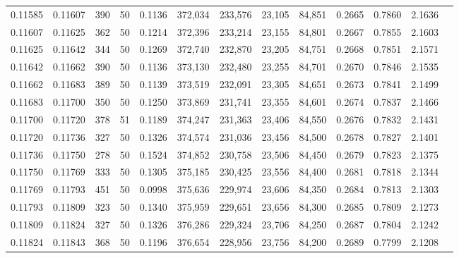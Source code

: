 \begin{tabular}{rrrrrrrrrrrrr}
0.11585 & 0.11607 &   390 &  50 &                                     0.1136 & 372,034 & 233,576 &  23,105 &  84,851 & 0.2665 & 0.7860 & 2.1636 \\
0.11607 & 0.11625 &   362 &  50 &                                     0.1214 & 372,396 & 233,214 &  23,155 &  84,801 & 0.2667 & 0.7855 & 2.1603 \\
0.11625 & 0.11642 &   344 &  50 &                                     0.1269 & 372,740 & 232,870 &  23,205 &  84,751 & 0.2668 & 0.7851 & 2.1571 \\
0.11642 & 0.11662 &   390 &  50 &                                     0.1136 & 373,130 & 232,480 &  23,255 &  84,701 & 0.2670 & 0.7846 & 2.1535 \\
0.11662 & 0.11683 &   389 &  50 &                                     0.1139 & 373,519 & 232,091 &  23,305 &  84,651 & 0.2673 & 0.7841 & 2.1499 \\
0.11683 & 0.11700 &   350 &  50 &                                     0.1250 & 373,869 & 231,741 &  23,355 &  84,601 & 0.2674 & 0.7837 & 2.1466 \\
0.11700 & 0.11720 &   378 &  51 &                                     0.1189 & 374,247 & 231,363 &  23,406 &  84,550 & 0.2676 & 0.7832 & 2.1431 \\
0.11720 & 0.11736 &   327 &  50 &                                     0.1326 & 374,574 & 231,036 &  23,456 &  84,500 & 0.2678 & 0.7827 & 2.1401 \\
0.11736 & 0.11750 &   278 &  50 &                                     0.1524 & 374,852 & 230,758 &  23,506 &  84,450 & 0.2679 & 0.7823 & 2.1375 \\
0.11750 & 0.11769 &   333 &  50 &                                     0.1305 & 375,185 & 230,425 &  23,556 &  84,400 & 0.2681 & 0.7818 & 2.1344 \\
0.11769 & 0.11793 &   451 &  50 &                                     0.0998 & 375,636 & 229,974 &  23,606 &  84,350 & 0.2684 & 0.7813 & 2.1303 \\
0.11793 & 0.11809 &   323 &  50 &                                     0.1340 & 375,959 & 229,651 &  23,656 &  84,300 & 0.2685 & 0.7809 & 2.1273 \\
0.11809 & 0.11824 &   327 &  50 &                                     0.1326 & 376,286 & 229,324 &  23,706 &  84,250 & 0.2687 & 0.7804 & 2.1242 \\
0.11824 & 0.11843 &   368 &  50 &                                     0.1196 & 376,654 & 228,956 &  23,756 &  84,200 & 0.2689 & 0.7799 & 2.1208 \\

\end{tabular}
